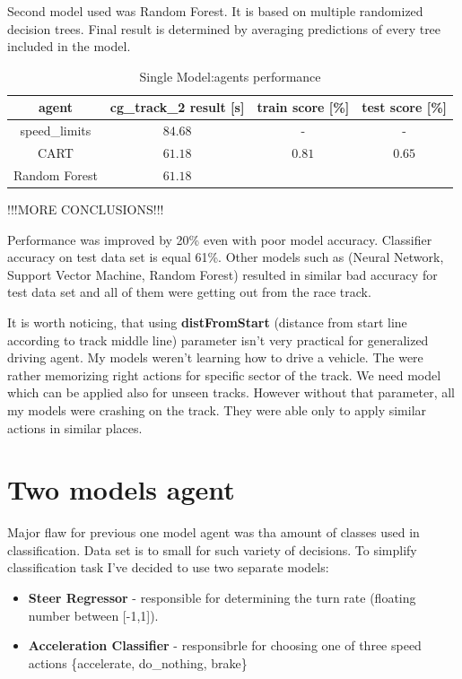 \documentclass[declaration,shortabstract,english,inz]{iithesis}
\begin{document}
Second model used was Random Forest. It is based on multiple randomized decision trees. Final result is determined by averaging predictions of every tree included in the model. 

\begin{table}[h]
    \centering
    \begin{tabular}{ |c|c|c|c|}
          \hline
          agent & cg\_track\_2 result [s] & train score [\%]& test score [\%]\\
          \hline
          speed\_limits & $84.68$ & - & -\\
          \hline
          CART &  $61.18$ & $0.81$ & $0.65$\\
          \hline
          Random Forest &  $61.18$ & & \\
          \hline
          
        \end{tabular}
        \caption{Single Model:agents performance}
        \label{tab:single_clp_tree}

\end{table}


!!!MORE CONCLUSIONS!!!

Performance was improved by 20\% even with poor model accuracy. Classifier accuracy on test data set is equal 61\%. Other models such as (Neural Network, Support Vector Machine, Random Forest) resulted in similar bad accuracy for test data set and all of them were getting out from the race track.   

It is worth noticing, that using \textbf{distFromStart} (distance from start line according to track middle line) parameter isn't very practical for generalized driving agent. My models weren't learning how to drive a vehicle. The were rather memorizing right actions for specific sector of the track. We need model which can be applied also for unseen tracks. However without that parameter, all my models were crashing on the track. They were able only to apply similar actions in similar places.

\section{Two models agent}

Major flaw for previous one model agent was tha amount of classes used in classification. Data set is to small for such variety of decisions. To simplify classification task I've decided to use two separate models: 

\begin{itemize}
    \item \textbf{Steer Regressor} - responsible for determining the turn rate (floating number between [-1,1]).
    \item \textbf{Acceleration Classifier} - responsibrle for choosing one of three speed actions \{accelerate, do\_nothing, brake\}
\end{itemize}
\end{document}
